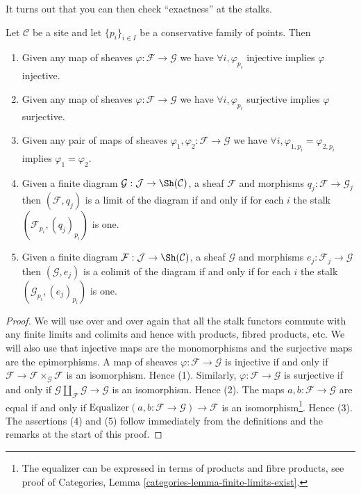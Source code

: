 \noindent
It turns out that you can then check ``exactness'' at the stalks.

\begin{lemma}
\label{lemma-exactness-stalks}
Let $\mathcal{C}$ be a site and let $\{p_i\}_{i\in I}$ be a conservative
family of points. Then
\begin{enumerate}
\item Given any map of sheaves $\varphi : \mathcal{F} \to \mathcal{G}$
we have $\forall i, \varphi_{p_i}$ injective implies $\varphi$ injective.
\item Given any map of sheaves $\varphi : \mathcal{F} \to \mathcal{G}$
we have $\forall i, \varphi_{p_i}$ surjective implies $\varphi$ surjective.
\item Given any pair of maps of sheaves
$\varphi_1, \varphi_2 : \mathcal{F} \to \mathcal{G}$
we have $\forall i, \varphi_{1, p_i} = \varphi_{2, p_i}$
implies $\varphi_1 = \varphi_2$.
\item Given a finite diagram $\mathcal{G} : \mathcal{J}
\to \Sh(\mathcal{C})$, a sheaf $\mathcal{F}$ and morphisms
$q_j : \mathcal{F} \to \mathcal{G}_j$ then $(\mathcal{F}, q_j)$
is a limit of the diagram if and only if for each $i$ the stalk
$(\mathcal{F}_{p_i}, (q_j)_{p_i})$ is one.
\item Given a finite diagram $\mathcal{F} : \mathcal{J}
\to \Sh(\mathcal{C})$, a sheaf $\mathcal{G}$ and morphisms
$e_j : \mathcal{F}_j \to \mathcal{G}$ then $(\mathcal{G}, e_j)$
is a colimit of the diagram if and only if for each $i$ the stalk
$(\mathcal{G}_{p_i}, (e_j)_{p_i})$ is one.
\end{enumerate}
\end{lemma}

\begin{proof}
We will use over and over again that all the stalk functors commute
with any finite limits and colimits and hence with products, fibred
products, etc. We will also use that injective maps are the monomorphisms
and the surjective maps are the epimorphisms.
A map of sheaves $\varphi : \mathcal{F} \to \mathcal{G}$
is injective if and only if
$\mathcal{F} \to \mathcal{F} \times_\mathcal{G} \mathcal{F}$
is an isomorphism. Hence (1).
Similarly, $\varphi : \mathcal{F} \to \mathcal{G}$
is surjective if and only if
$\mathcal{G} \amalg_\mathcal{F} \mathcal{G} \to \mathcal{G}$
is an isomorphism. Hence (2).
The maps $a, b : \mathcal{F} \to \mathcal{G}$
are equal if and only if
$\text{Equalizer}(a, b : \mathcal{F} \to \mathcal{G}) \to \mathcal{F}$
is an isomorphism\footnote{The equalizer can be expressed
in terms of products and fibre products, see proof of
Categories, Lemma \ref{categories-lemma-finite-limits-exist}.}. Hence (3).
The assertions (4) and (5) follow immediately from the definitions
and the remarks at the start of this proof.
\end{proof}

